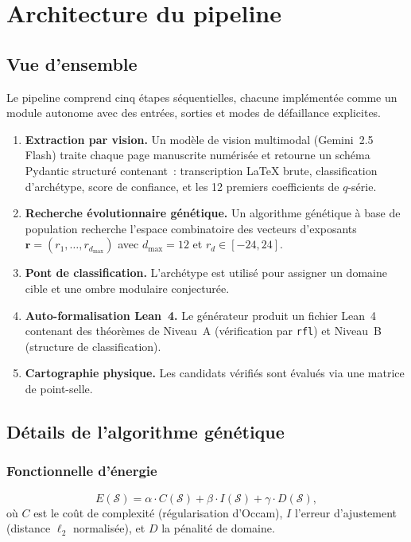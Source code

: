 \section{Architecture du pipeline \RAMA{}}
\label{sec:pipeline}

\subsection{Vue d'ensemble}

Le pipeline \RAMA{} comprend cinq étapes séquentielles, chacune implémentée comme un module autonome avec des entrées, sorties et modes de défaillance explicites.

\begin{enumerate}[label=\textbf{Étape~\arabic*:},leftmargin=3cm]
  \item \textbf{Extraction par vision.} Un modèle de vision multimodal (Gemini~2.5 Flash) traite chaque page manuscrite numérisée et retourne un schéma Pydantic structuré contenant~: transcription \LaTeX{} brute, classification d'archétype, score de confiance, et les 12 premiers coefficients de $q$-série.
  \item \textbf{Recherche évolutionnaire génétique.} Un algorithme génétique à base de population recherche l'espace combinatoire des vecteurs d'exposants $\mathbf{r} = (r_1, \ldots, r_{d_{\max}})$ avec $d_{\max} = 12$ et $r_d \in [-24, 24]$.
  \item \textbf{Pont de classification.} L'archétype est utilisé pour assigner un domaine cible et une ombre modulaire conjecturée.
  \item \textbf{Auto-formalisation Lean~4.} Le générateur produit un fichier Lean~4 contenant des théorèmes de Niveau~A (vérification par \texttt{rfl}) et Niveau~B (structure de classification).
  \item \textbf{Cartographie physique.} Les candidats vérifiés sont évalués via une matrice de point-selle.
\end{enumerate}

\subsection{Détails de l'algorithme génétique}

\subsubsection{Fonctionnelle d'énergie}
\begin{equation}
  E(\mathcal{S}) = \alpha \cdot C(\mathcal{S}) + \beta \cdot I(\mathcal{S}) + \gamma \cdot D(\mathcal{S}),
\end{equation}
où $C$ est le coût de complexité (régularisation d'Occam), $I$ l'erreur d'ajustement (distance $\ell_2$ normalisée), et $D$ la pénalité de domaine.

